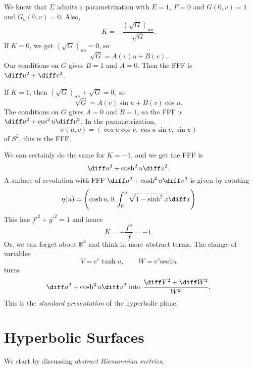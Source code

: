 \documentclass[12pt]{article}
\begin{document}
\begin{proofbox}
	We know that $\Sigma$ admits a parametrization with $E = 1$, $F = 0$ and $G(0, v) = 1$ and $G_u(0, v) = 0$. Also,
	\[
		K = - \frac{(\sqrt G)_{uu}}{\sqrt G}.
	\]
	If $K = 0$, we get $(\sqrt G)_{uu} = 0$, so
	\[
	\sqrt G = A(v) u + B(v).
	\]
	Our conditions on $G$ gives $B = 1$ and $A = 0$. Then the FFF is $\diff u^2 + \diff v^2$.

	If $K = 1$, then $(\sqrt G)_{uu} + \sqrt G = 0$, so
	\[
	\sqrt G = A(v) \sin u + B(v) \cos u.
	\]
	The conditions on $G$ gives $A = 0$ and $B = 1$, so the FFF is $\diff u^2 + \cos^2 u \diff v^2$. In the parametrization,
	\[
	\sigma(u, v) = (\cos u \cos v, \cos u \sin v, \sin u)
	\]
	of $S^2$, this is the FFF.
\end{proofbox}

\begin{remark}
	We can certainly do the same for $K = -1$, and we get the FFF is
	\[
	\diff u^2 + \cosh^2 u \diff v^2.
	\]
	A surface of revolution with FFF $\diff u^2 + \cosh^2 u \diff v^2$ is given by rotating
	\[
	\eta(u) = \Biggl(\cosh u, 0, \int_{0}^{u} \sqrt{1 - \sinh^2 x} \diff x \Biggr)
	\]
	This has $f'^2 + g'^2 = 1$ and hence
	\[
	K = - \frac{f''}{f} = -1.
	\]
	Or, we can forget about $\mathbb{R}^3$ and think in more abstract terms. The change of variables
	\[
		V = e^{v}\tanh u, \qquad W = e^{v} \mathrm{sech} u
	\]
	turns
	\[
		\diff u^2 + \cosh^2 u \diff v^2 \text{ into } \frac{\diff V^2 + \diff W^2}{W^2}.
	\]
	This is the \emph{standard presentation} of the hyperbolic plane.
\end{remark}

\newpage


\section{Hyperbolic Surfaces}
\label{sec:hyperbolic_surfaces}

We start by discussing \emph{abstract Riemannian metrics}.
\end{document}
